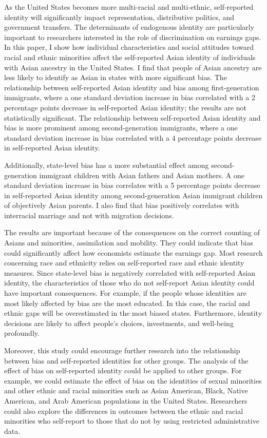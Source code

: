 As the United States becomes more multi-racial and multi-ethnic, self-reported identity will significantly impact representation, distributive politics, and government transfers. The determinants of endogenous identity are particularly important to researchers interested in the role of discrimination on earnings gaps. In this paper, I show how individual characteristics and social attitudes toward racial and ethnic minorities affect the self-reported Asian identity of individuals with Asian ancestry in the United States. I find that people of Asian ancestry are less likely to identify as Asian in states with more significant bias. The relationship between self-reported Asian identity and bias among first-generation immigrants, where a one standard deviation increase in bias correlated with a 2 percentage points decrease in self-reported Asian identity; the results are not statistically significant. The relationship between self-reported Asian identity and bias is more prominent among second-generation immigrants, where a one standard deviation increase in bias correlated with a 4 percentage points decrease in self-reported Asian identity. 

Additionally, state-level bias has a more substantial effect among second-generation immigrant children with Asian fathers and Asian mothers. A one standard deviation increase in bias correlates with a 5 percentage points decrease in self-reported Asian identity among second-generation Asian immigrant children of objectively Asian parents. I also find that bias positively correlates with interracial marriage and not with migration decisions.

The results are important because of the consequences on the correct counting of Asians and minorities, assimilation and mobility. They could indicate that bias could significantly affect how economists estimate the earnings gap. Most research concerning race and ethnicity relies on self-reported race and ethnic identity measures. Since state-level bias is negatively correlated with self-reported Asian identity, the characteristics of those who do not self-report Asian identity could have important consequences. For example, if the people whose identities are most likely affected by bias are the most educated. In this case, the racial and ethnic gaps will be overestimated in the most biased states. Furthermore, identity decisions are likely to affect people's choices, investments, and well-being profoundly. 

Moreover, this study could encourage further research into the relationship between bias and self-reported identities for other groups. The analysis of the effect of bias on self-reported identity could be applied to other groups. For example, we could estimate the effect of bias on the identities of sexual minorities and other ethnic and racial minorities such as Asian American, Black, Native American, and Arab American populations in the United States. Researchers could also explore the differences in outcomes between the ethnic and racial minorities who self-report to those that do not by using restricted administrative data. 
